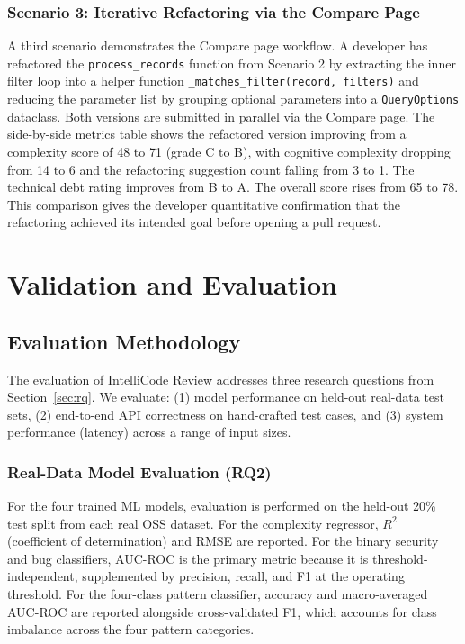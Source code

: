 \documentclass[12pt, oneside]{report}
\begin{document}
\subsection{Scenario 3: Iterative Refactoring via the Compare Page}

A third scenario demonstrates the Compare page workflow. A developer has refactored the
\texttt{process\_records} function from Scenario 2 by extracting the inner filter loop
into a helper function \texttt{\_matches\_filter(record, filters)} and reducing the
parameter list by grouping optional parameters into a \texttt{QueryOptions} dataclass.
Both versions are submitted in parallel via the Compare page. The side-by-side metrics
table shows the refactored version improving from a complexity score of 48 to 71 (grade
C to B), with cognitive complexity dropping from 14 to 6 and the refactoring suggestion
count falling from 3 to 1. The technical debt rating improves from B to A. The overall
score rises from 65 to 78. This comparison gives the developer quantitative confirmation
that the refactoring achieved its intended goal before opening a pull request.

\chapter{Validation and Evaluation}
\label{ch:eval}

\section{Evaluation Methodology}
\label{sec:eval-methodology}

The evaluation of IntelliCode Review addresses three research questions from
Section~\ref{sec:rq}. We evaluate: (1) model performance on held-out real-data test sets,
(2) end-to-end API correctness on hand-crafted test cases, and (3) system performance
(latency) across a range of input sizes.

\subsection{Real-Data Model Evaluation (RQ2)}

For the four trained ML models, evaluation is performed on the held-out 20\% test
split from each real OSS dataset. For the complexity regressor, $R^2$ (coefficient of
determination) and RMSE are reported. For the binary security and bug classifiers,
AUC-ROC is the primary metric because it is threshold-independent, supplemented by
precision, recall, and F1 at the operating threshold. For the four-class pattern
classifier, accuracy and macro-averaged AUC-ROC are reported alongside
cross-validated F1, which accounts for class imbalance across the four pattern
categories.
\end{document}
